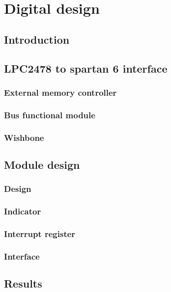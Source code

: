 \chapter{Digital design}
\section{Introduction}
\section{LPC2478 to spartan 6 interface}
\subsection{External memory controller}
\subsection{Bus functional module}
\subsection{Wishbone}
\section{Module design}
\subsection{Design}
\subsection{Indicator}
\subsection{Interrupt register}
\subsection{Interface}
\section{Results}


